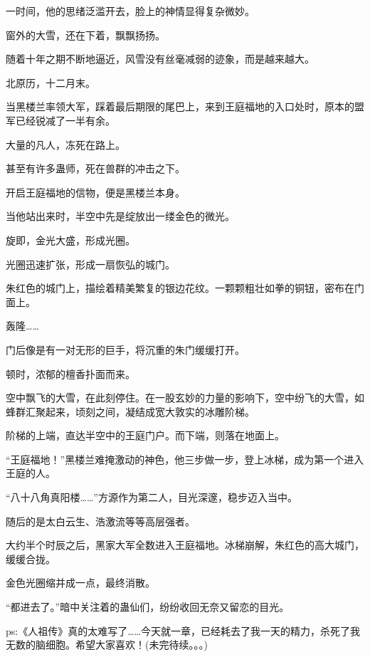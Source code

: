 \begin{this_body}
一时间，他的思绪泛滥开去，脸上的神情显得复杂微妙。

窗外的大雪，还在下着，飘飘扬扬。

随着十年之期不断地逼近，风雪没有丝毫减弱的迹象，而是越来越大。

北原历，十二月末。

当黑楼兰率领大军，踩着最后期限的尾巴上，来到王庭福地的入口处时，原本的盟军已经锐减了一半有余。

大量的凡人，冻死在路上。

甚至有许多蛊师，死在兽群的冲击之下。

开启王庭福地的信物，便是黑楼兰本身。

当他站出来时，半空中先是绽放出一缕金色的微光。

旋即，金光大盛，形成光圈。

光圈迅速扩张，形成一扇恢弘的城门。

朱红色的城门上，描绘着精美繁复的银边花纹。一颗颗粗壮如拳的铜钮，密布在门面上。

轰隆……

门后像是有一对无形的巨手，将沉重的朱门缓缓打开。

顿时，浓郁的檀香扑面而来。

空中飘飞的大雪，在此刻停住。在一股玄妙的力量的影响下，空中纷飞的大雪，如蜂群汇聚起来，顷刻之间，凝结成宽大敦实的冰雕阶梯。

阶梯的上端，直达半空中的王庭门户。而下端，则落在地面上。

“王庭福地！”黑楼兰难掩激动的神色，他三步做一步，登上冰梯，成为第一个进入王庭的人。

“八十八角真阳楼……”方源作为第二人，目光深邃，稳步迈入当中。

随后的是太白云生、浩激流等等高层强者。

大约半个时辰之后，黑家大军全数进入王庭福地。冰梯崩解，朱红色的高大城门，缓缓合拢。

金色光圈缩并成一点，最终消散。

“都进去了。”暗中关注着的蛊仙们，纷纷收回无奈又留恋的目光。

ps:《人祖传》真的太难写了……今天就一章，已经耗去了我一天的精力，杀死了我无数的脑细胞。希望大家喜欢！(未完待续。。。)

\end{this_body}

